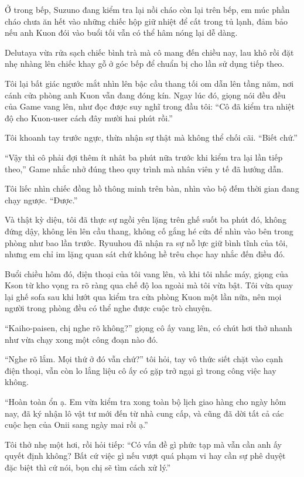 \documentclass[../main.tex]{subfiles}
\begin{document}
Ở trong bếp, Suzuno đang kiểm tra lại nồi cháo còn lại trên bếp, em múc phần cháo chưa ăn hết vào những chiếc hộp giữ nhiệt để cất trong tủ lạnh, đảm bảo nếu anh Kuon đói vào buổi tối vẫn có thể hâm nóng lại dễ dàng. 

Delutaya vừa rửa sạch chiếc bình trà mà cô mang đến chiều nay, lau khô rồi đặt nhẹ nhàng lên chiếc khay gỗ ở góc bếp để chuẩn bị cho lần sử dụng tiếp theo.

Tôi lại bất giác ngước mắt nhìn lên bậc cầu thang tối om dẫn lên tầng năm, nơi cánh cửa phòng anh Kuon vẫn đang đóng kín. Ngay lúc đó, giọng nói đều đều của Game vang lên, như đọc được suy nghĩ trong đầu tôi: ``Cô đã kiểm tra nhiệt độ cho Kuon-user cách đây mười hai phút rồi.''

Tôi khoanh tay trước ngực, thừa nhận sự thật mà không thể chối cãi. ``Biết chứ.''

``Vậy thì cô phải đợi thêm ít nhât ba phút nữa trước khi kiểm tra lại lần tiếp theo,'' Game nhắc nhở đúng theo quy trình mà nhân viên y tế đã hướng dẫn.

Tôi liếc nhìn chiếc đồng hồ thông minh trên bàn, nhìn vào bộ đếm thời gian đang chạy ngược. ``Được.''

Và thật kỳ diệu, tôi đã thực sự ngồi yên lặng trên ghế suốt ba phút đó, không đứng dậy, không lẻn lên cầu thang, không cố gắng hé cửa để nhìn vào bên trong phòng như bao lần trước. Ryuuhou đã nhận ra sự nỗ lực giữ bình tĩnh của tôi, nhưng em chỉ im lặng quan sát chứ không hề trêu chọc hay nhắc đến điều đó.

\ct

Buổi chiều hôm đó, điện thoại của tôi vang lên, và khi tôi nhấc máy, giọng của Kson từ kho vọng ra rõ ràng qua chế độ loa ngoài mà tôi vừa bật. Tôi vừa quay lại ghế sofa sau khi lướt qua kiểm tra cửa phòng Kuon một lần nữa, nên mọi người trong phòng đều có thể nghe được cuộc trò chuyện.

``Kaiho-paisen, chị nghe rõ không?'' giọng cô ấy vang lên, có chút hơi thở nhanh như vừa chạy xong một công đoạn nào đó.

``Nghe rõ lắm. Mọi thứ ở đó vẫn chứ?'' tôi hỏi, tay vô thức siết chặt vào cạnh điện thoại, vẫn còn lo lắng liệu cô ấy có gặp trở ngại gì trong công việc hay không.

``Hoàn toàn ổn ạ. Em vừa kiểm tra xong toàn bộ lịch giao hàng cho ngày hôm nay, đã ký nhận lô vật tư mới đến từ nhà cung cấp, và cũng đã dời tất cả các cuộc hẹn của Onii sang ngày mai rồi ạ.''

Tôi thở nhẹ một hơi, rồi hỏi tiếp: ``Có vấn đề gì phức tạp mà vẫn cần anh ấy quyết định không? Bất cứ việc gì nếu vượt quá phạm vi hay cần sự phê duyệt đặc biệt thì cứ nói, bọn chị sẽ tìm cách xử lý.''
\end{document}

